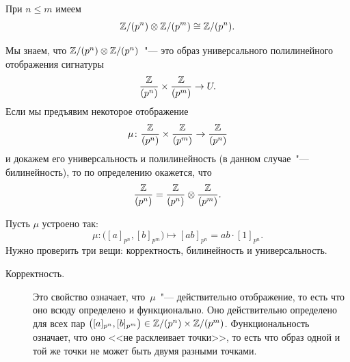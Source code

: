 \begin{example}
	При $n \leq m$ имеем
	\[
		\mathbb{Z}/(p^n) \otimes \mathbb{Z}/(p^m)
		\cong
		\mathbb{Z}/(p^n)
		.
	\]
\end{example}
\begin{proofm}
	Мы знаем, что $\mathbb{Z}/(p^n) \otimes \mathbb{Z}/(p^n)$~"--- это образ универсального полилинейного отображения сигнатуры
	\[
		\frac{\mathbb{Z}}{(p^n)}
		\times
		\frac{\mathbb{Z}}{(p^m)}
		\to
		U
		.
	\]
	Если мы предъявим некоторое отображение
	\[
		\mu \colon
		\frac{\mathbb{Z}}{(p^n)}
		\times
		\frac{\mathbb{Z}}{(p^m)}
		\to
		\frac{\mathbb{Z}}{(p^n)}
	\]
	и докажем его универсальность и полилинейность (в данном случае~"--- билинейность), то по определению окажется, что
	\[
		\frac{\mathbb{Z}}{(p^n)}
		=
		\frac{\mathbb{Z}}{(p^n)}
		\otimes
		\frac{\mathbb{Z}}{(p^m)}
		.
	\]

	Пусть $\mu$ устроено так:
	\[
		\mu \colon
		\bigl(
			[a]_{p^n}
			,
			[b]_{p^m}
		\bigr)
		\mapsto
		[ab]_{p^n}
		=
		ab \cdot [1]_{p^n}
		.
	\]
	Нужно проверить три вещи: корректность, билинейность и универсальность.

	\begin{description}
		\item[Корректность.] Это свойство означает, что~$\mu$~"--- действительно отображение, то есть что оно всюду определено и функционально. Оно действительно определено для всех пар 
			$
				\bigl(
					[a]_{p^n}
					,
					[b]_{p^m}
				\bigr)
				\in
				\mathbb{Z}/(p^n)
				\times
				\mathbb{Z}/(p^m)
			$. Функциональность означает, что оно <<не расклеивает точки>>, то есть что образ одной и той же точки не может быть двумя разными точками.

			

\end{description}
\end{proofm}
